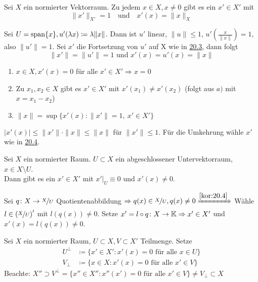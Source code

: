\begin{kor} \label{kor:20.4}
	Sei $X$ ein normierter Vektorraum. Zu jedem $x \in X, x \neq 0$ gibt es ein $x' \in X'$ mit 
		\[ \| x' \|_{X'} = 1 \quad \text{und} \quad x'(x) = \| x \|_{X} \]
\end{kor}

\begin{beweis}
	Sei $U = \operatorname{span} \{ x \}, u'( \lambda x) \coloneqq \lambda \| x \|$. Dann ist $u'$ linear, $\| u \| \leq 1$, $u'(\frac{x}{\| x \|}) = 1$, also $\| u' \| = 1$. Sei $x'$ die Fortsetzung von $u'$ auf X wie in \hyperref[satz:20.3-Hahn-Banach]{20.3}, dann folgt
	\[ \| x' \| = \| u' \| = 1 \text{ und } x'(x) = u'(x) = \| x \| \]
\end{beweis}


\begin{folgerung}
	\begin{enumerate}[label=\alph*\upshape)]
		\item $x \in X, x'(x) = 0$ für alle $x' \in X' \Rightarrow x = 0$
		\item Zu $x_{1}, x_{2} \in X$ gibt es $x' \in X'$ mit $x'(x_{1}) \neq x'(x_{2})$ (folgt aus $a)$ mit $x = x_{1} - x_{2}$)
		\item $\| x \| = \sup \{ x'(x) : \| x' \| = 1, ~ x' \in X' \}$
	\end{enumerate}	
\end{folgerung}

\begin{beweis}
	$|x'(x) | \leq \| x' \| \cdot \| x \| \leq \| x \|$ für $\| x' \| \leq 1$.
	Für die Umkehrung wähle $x'$ wie in \hyperref[kor:20.4]{20.4}.
\end{beweis}


\begin{kor} \label{kor:20.6}
	Sei $X$ ein normierter Raum. $U \subset X$ ein abgeschlossener Untervektorraum, $x \in X \setminus U$. \\
	Dann gibt es ein $x' \in X'$ mit $x'|_{U} \equiv 0$ und $x'(x) \neq 0$.	
\end{kor}

\begin{beweis}
	Sei $q \colon X \rightarrow \nicefrac{X}{U}$ Quotientenabbildung $\Rightarrow q(x) \in \nicefrac{X}{U}, q(x) \neq 0 \xRightarrow[]{\ref{kor:20.4}}$ Wähle $l \in \left(\nicefrac{X}{U}\right)'$ mit $l(q(x)) \neq 0$. Setze $x' = l \circ q \colon X \rightarrow \mathbb{K} \Rightarrow x' \in X'$ und $x'(x) = l(q(x)) \neq 0$.
\end{beweis}


\begin{definition}
	Sei $X$ ein normierter Raum, $U \subset X, V \subset X'$ Teilmenge. Setze
	\begin{align*}
		U^{\bot} & \coloneqq \{ x' \in X' : x'(x) = 0 \text{ für alle } x \in U \} \\
		V_{\bot} & \coloneqq \{ x \in X : x'(x) = 0 \text{ für alle } x' \in V \} 
	\end{align*}
	Beachte: $X'' \supset V^{\bot} = \{  x'' \in X'' : x''(x') = 0 \text{ für alle } x' \in V \} \neq V_{\bot} \subset X$
\end{definition}


